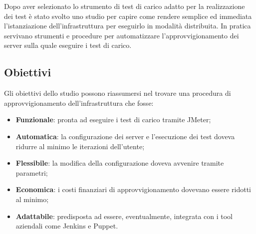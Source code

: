 Dopo aver selezionato lo strumento di test di carico adatto per la realizzazione dei test è stato svolto uno studio per capire come rendere semplice ed immediata l'istanziazione dell'infrastruttura per eseguirlo in modalità distribuita. In pratica servivano strumenti e procedure per automatizzare l'approvvigionamento dei server sulla quale eseguire i test di carico.
\subsection{Obiettivi}
Gli obiettivi dello studio possono riassumersi nel trovare una procedura di approvvigionamento dell'infrastruttura che fosse:
\begin{itemize}
	\item \textbf{Funzionale}: pronta ad eseguire i test di carico tramite JMeter;
	\item \textbf{Automatica}: la configurazione dei server e l'esecuzione dei test doveva ridurre al minimo le iterazioni dell'utente;
	\item \textbf{Flessibile}: la modifica della configurazione doveva avvenire tramite parametri;
	\item \textbf{Economica}: i costi finanziari di approvvigionamento dovevano essere ridotti al minimo;
	\item \textbf{Adattabile}: predisposta ad essere, eventualmente, integrata con i tool aziendali come Jenkins e Puppet.
\end{itemize}
